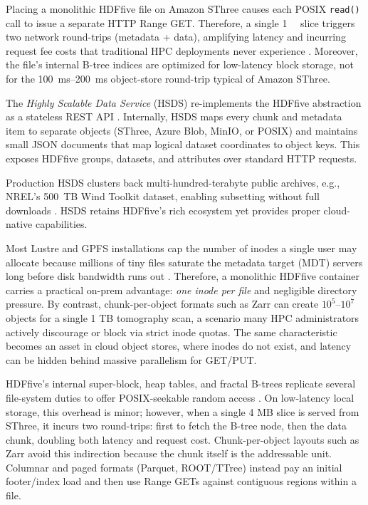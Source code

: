\documentclass[nomenclature, english, bibtex]{kththesis}
\numberwithin{listing}{chapter}
\begin{document}
Placing a monolithic \gls{HDFfive} file on Amazon \gls{SThree} causes each \gls{POSIX} \texttt{read()} call to issue a separate \gls{HTTP} Range GET. Therefore, a single \SI{1}{\mega\byte} slice triggers two network round-trips (metadata + data), amplifying latency and incurring request fee costs that traditional \gls{HPC} deployments never experience \cite{hdf5_ros3}. Moreover, the file's internal B-tree indices are optimized for low-latency block storage, not for the \SIrange{100}{200}{\milli\second} object-store round-trip typical of Amazon \gls{SThree}.

The \emph{Highly Scalable Data Service} (\gls{HSDS}) re-implements the \gls{HDFfive} abstraction as a stateless REST \gls{API} \cite{readey2020hsds}. Internally, \gls{HSDS} maps every chunk and metadata item to separate objects (\gls{SThree}, Azure Blob, \gls{MinIO}, or \gls{POSIX}) and maintains small \gls{JSON} documents that map logical dataset coordinates to object keys. This exposes \gls{HDFfive} groups, datasets, and attributes over standard \gls{HTTP} requests.

Production \gls{HSDS} clusters back multi-hundred-terabyte public archives, e.g., \gls{NREL}’s 500\, TB Wind Toolkit dataset, enabling subsetting without full downloads \cite{draxl2024wtkled}. \gls{HSDS} retains \gls{HDFfive}’s rich ecosystem yet provides proper cloud-native capabilities.

Most Lustre and \gls{GPFS} installations cap the number of inodes a single user may allocate because millions of tiny files saturate the metadata target (MDT) servers long before disk bandwidth runs out \cite{gmitter2018smallfile}. Therefore, a monolithic \gls{HDFfive} container carries a practical on-prem advantage: \emph{one inode per file} and negligible directory pressure. By contrast, chunk-per-object formats such as Zarr can create $10^{5}$–$10^{7}$ objects for a single 1 TB tomography scan, a scenario many \gls{HPC} administrators actively discourage or block via strict inode quotas. The same characteristic becomes an asset in cloud object stores, where inodes do not exist, and latency can be hidden behind massive parallelism for GET/PUT.

\gls{HDFfive}’s internal super-block, heap tables, and fractal B-trees replicate several file-system duties to offer \gls{POSIX}-seekable random access \cite{howison2010tuning}. On low-latency local storage, this overhead is minor; however, when a single 4 MB slice is served from \gls{SThree}, it incurs two round-trips: first to fetch the B-tree node, then the data chunk, doubling both latency and request cost. Chunk-per-object layouts such as Zarr avoid this indirection because the chunk itself is the addressable unit. Columnar and paged formats (Parquet, \gls{ROOT}/\gls{TTree}) instead pay an initial footer/index load and then use Range GETs against contiguous regions within a file.
\end{document}
